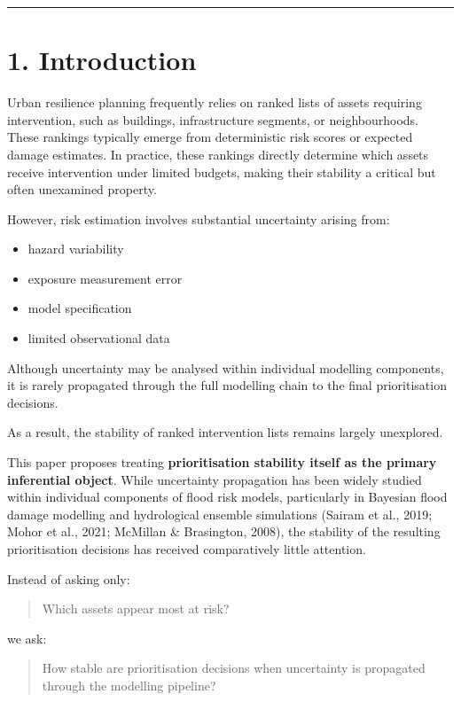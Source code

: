 \documentclass[
]{article}
\providecommand{\tightlist}{%
  \setlength{\itemsep}{0pt}\setlength{\parskip}{0pt}}
\begin{document}
\begin{center}\rule{0.5\linewidth}{0.5pt}\end{center}

\section{1. Introduction}\label{introduction}

Urban resilience planning frequently relies on ranked lists of assets
requiring intervention, such as buildings, infrastructure segments, or
neighbourhoods. These rankings typically emerge from deterministic risk
scores or expected damage estimates. In practice, these rankings
directly determine which assets receive intervention under limited
budgets, making their stability a critical but often unexamined
property.

However, risk estimation involves substantial uncertainty arising from:

\begin{itemize}
\tightlist
\item
  hazard variability
\item
  exposure measurement error
\item
  model specification
\item
  limited observational data
\end{itemize}

Although uncertainty may be analysed within individual modelling
components, it is rarely propagated through the full modelling chain to
the final prioritisation decisions.

As a result, the stability of ranked intervention lists remains largely
unexplored.

This paper proposes treating \textbf{prioritisation stability itself as
the primary inferential object}. While uncertainty propagation has been
widely studied within individual components of flood risk models,
particularly in Bayesian flood damage modelling and hydrological
ensemble simulations (Sairam et al., 2019; Mohor et al., 2021; McMillan
\& Brasington, 2008), the stability of the resulting prioritisation
decisions has received comparatively little attention.

Instead of asking only:

\begin{quote}
Which assets appear most at risk?
\end{quote}

we ask:

\begin{quote}
How stable are prioritisation decisions when uncertainty is propagated
through the modelling pipeline?
\end{quote}
\end{document}
